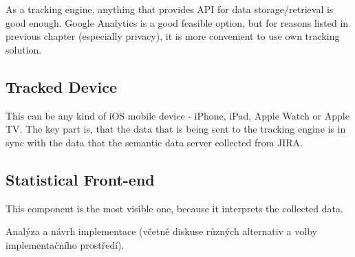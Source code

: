 As a tracking engine, anything that provides API for data storage/retrieval is good enough. Google Analytics is a good feasible option, but for reasons listed in previous chapter (especially privacy), it is more convenient to use own tracking solution.


\subsection{Tracked Device}

This can be any kind of iOS mobile device - iPhone, iPad, Apple Watch or Apple TV. The key part is, that the data that is being sent to the tracking engine is in sync with the data that the semantic data server collected from JIRA.


\subsection{Statistical Front-end}

This component is the most visible one, because it interprets the collected data.


Analýza a návrh implementace (včetně diskuse různých alternativ a volby implementačního prostředí).